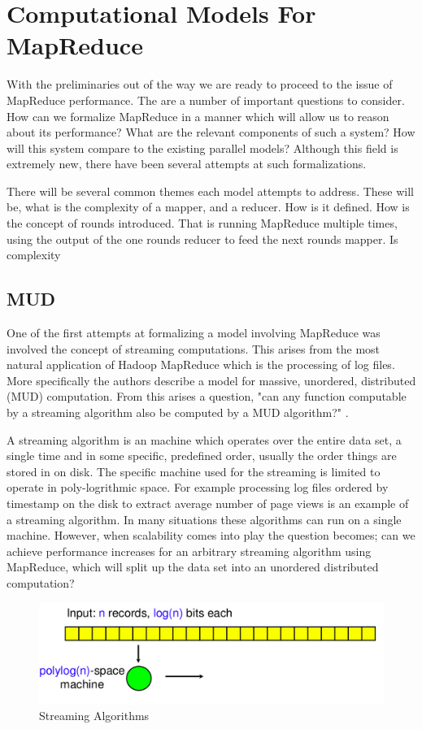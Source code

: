 \documentclass{article}
\begin{document}
\section{Computational Models For MapReduce}
With the preliminaries out of the way we are ready to proceed to the issue of MapReduce performance. The are a number of important questions to consider. How can we formalize MapReduce in a manner which will allow us to reason about its performance? What are the relevant components of such a system? How will this system compare to the existing parallel models? Although this field is extremely new, there have been several attempts at such formalizations. 

There will be several common themes each model attempts to address. These will be, what is the complexity of a mapper, and a reducer. How is it defined. How is the concept of rounds introduced. That is running MapReduce multiple times, using the output of the one rounds reducer to feed the next rounds mapper. Is complexity 

\subsection{MUD}
One of the first attempts at formalizing a model involving MapReduce was involved the concept of streaming computations. This arises from the most natural application of Hadoop MapReduce which is the processing of log files. More specifically the authors describe a model for  massive, unordered, distributed (MUD) computation. From this arises a question, "can any function computable by a streaming algorithm also be computed by a MUD algorithm?" \cite{mud}.  

A streaming algorithm is an machine which operates over the entire data set, a single time and in some specific, predefined order, usually the order things are stored in on disk. The specific machine used for the streaming is limited to operate in poly-logrithmic space. For example processing log files ordered by timestamp on the disk to extract average number of page views is an example of a streaming algorithm. In many situations these algorithms can run on a single machine. However, when scalability comes into play the question becomes; can we achieve performance increases for an arbitrary streaming algorithm using MapReduce, which will split up the data set into an unordered distributed computation?

\begin{figure}[h]
\begin{center}
\includegraphics[width=120mm]{streaming.png}
\caption{Streaming Algorithms \cite{mud2}}
\label{fig:streaming}
\end{center}
\end{figure}
\end{document}
